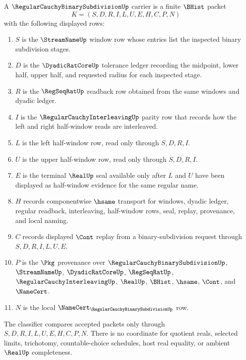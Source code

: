 \begin{definition}
\label{def:regular-cauchy-binary-subdivision-carrier}
A $\RegularCauchyBinarySubdivisionUp$ carrier is a finite $\BHist$ packet
$$
K=(S,D,R,I,L,U,E,H,C,P,N)
$$
with the following displayed rows:
\begin{enumerate}
\item $S$ is the $\StreamNameUp$ window row whose entries list the inspected binary subdivision stages.
\item $D$ is the $\DyadicRatCoreUp$ tolerance ledger recording the midpoint, lower half, upper half, and requested radius for each inspected stage.
\item $R$ is the $\RegSeqRatUp$ readback row obtained from the same windows and dyadic ledger.
\item $I$ is the $\RegularCauchyInterleavingUp$ parity row that records how the left and right half-window reads are interleaved.
\item $L$ is the left half-window row, read only through $S,D,R,I$.
\item $U$ is the upper half-window row, read only through $S,D,R,I$.
\item $E$ is the terminal $\RealUp$ seal available only after $L$ and $U$ have been displayed as half-window evidence for the same regular name.
\item $H$ records componentwise $\hsame$ transport for windows, dyadic ledger, regular readback, interleaving, half-window rows, seal, replay, provenance, and local naming.
\item $C$ records displayed $\Cont$ replay from a binary-subdivision request through $S,D,R,I,L,U,E$.
\item $P$ is the $\Pkg$ provenance over $\RegularCauchyBinarySubdivisionUp$, $\StreamNameUp$, $\DyadicRatCoreUp$, $\RegSeqRatUp$, $\RegularCauchyInterleavingUp$, $\RealUp$, $\BHist$, $\hsame$, $\Cont$, and $\NameCert$.
\item $N$ is the local $\NameCert_{\RegularCauchyBinarySubdivisionUp}$ row.
\end{enumerate}
The classifier compares accepted packets only through $S,D,R,I,L,U,E,H,C,P,N$. There is no coordinate for quotient reals, selected limits, trichotomy, countable-choice schedules, host real equality, or ambient $\RealUp$ completeness.
\end{definition}

